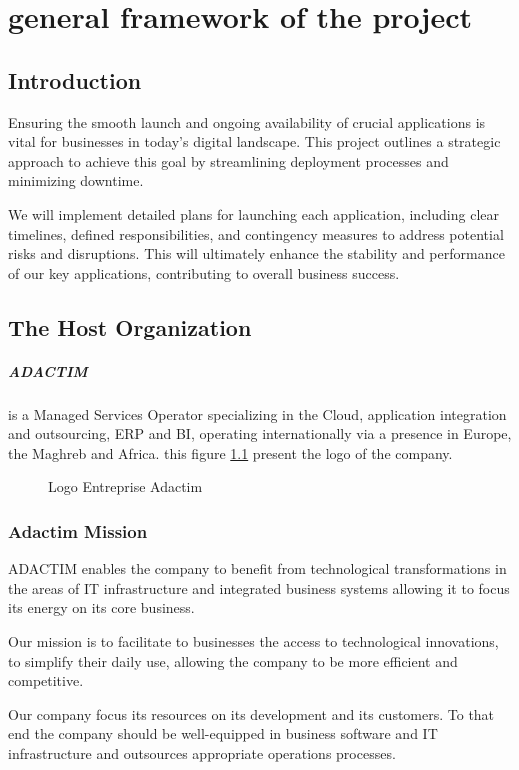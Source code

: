 \chapter{general framework of the project}
\section*{Introduction}
Ensuring the smooth launch and ongoing availability of crucial applications is vital for businesses in today's digital landscape. This project outlines a strategic approach to achieve this goal by streamlining deployment processes and minimizing downtime. 
\par 
We will implement detailed plans for launching each application, including clear timelines, defined responsibilities, and contingency measures to address potential risks and disruptions. This will ultimately enhance the stability and performance of our key applications, contributing to overall business success.
\section{The Host Organization}
\paragraph[short]{ADACTIM}
is a Managed Services Operator specializing in the Cloud, application integration and outsourcing, ERP and BI, operating internationally via a presence in Europe, the Maghreb and Africa.
\newline
this figure \ref{fig:logo_Adactim} present the logo of the company.

\begin{figure}[htpb]
    \centering
    \caption{Logo Entreprise Adactim}
    \label{fig:logo_Adactim}
\end{figure}

\subsection*{Adactim  Mission}
ADACTIM enables the company to benefit from technological transformations in the areas of IT infrastructure and integrated business systems allowing it to focus its energy on its core business.
\par
Our mission is to facilitate to businesses the access to technological innovations, to simplify their daily use, allowing the company to be more efficient and competitive.
\par
Our company  focus its resources on its development and its customers. To that end the company should be well-equipped in business software and IT infrastructure and outsources appropriate operations processes.

